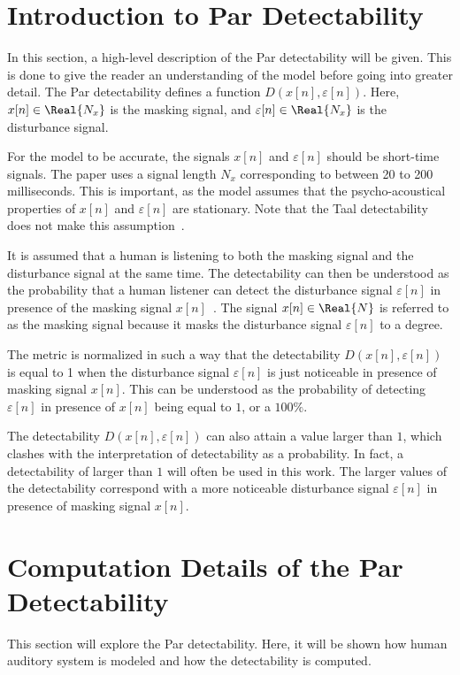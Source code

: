 \section{Introduction to Par Detectability}
In this section, a high-level description of the Par detectability will be given.
This is done to give the reader an understanding of the model before going into greater detail.
The Par detectability defines a function $D(x[n],\varepsilon[n])$.
Here, $x[n]\in\Real{N_x}$ is the masking signal, and $\varepsilon[n]\in\Real{N_x}$ is the disturbance signal.

For the model to be accurate, the signals $x[n]$ and $\varepsilon[n]$ should be short-time signals.
The paper uses a signal length $N_x$ corresponding to between 20 to 200 milliseconds.    
This is important, as the model assumes that the psycho-acoustical properties of $x[n]$ and $\varepsilon[n]$ are stationary.  
Note that the Taal detectability does not make this assumption~\cite{taal2012low}.

It is assumed that a human is listening to both the masking signal and the disturbance signal at the same time.
The detectability can then be understood as the probability that a human listener can detect the disturbance signal 
$\varepsilon[n]$ in presence of the masking signal $x[n]$~\cite{van2005perceptual}.
The signal $x[n]\in\Real{N}$ is referred to as the masking signal because it masks the disturbance signal 
$\varepsilon[n]$ to a degree.

The metric is normalized in such a way that the detectability $D(x[n],\varepsilon[n])$ is equal to 1 when the 
disturbance signal $\varepsilon[n]$ is just noticeable in presence of masking signal $x[n]$.
This can be understood as the probability of detecting $\varepsilon[n]$ in presence of $x[n]$ 
being equal to $1$, or a $100\%$.

The detectability $D(x[n],\varepsilon[n])$ can also attain a value larger than $1$, which clashes with the 
interpretation of detectability as a probability.
In fact, a detectability of larger than $1$ will often be used in this work.
The larger values of the detectability correspond with a more noticeable disturbance signal $\varepsilon[n]$ 
in presence of masking signal $x[n]$. 

\section{Computation Details of the Par Detectability}
This section will explore the Par detectability.
Here, it will be shown how human auditory system is modeled and how the detectability is computed.

